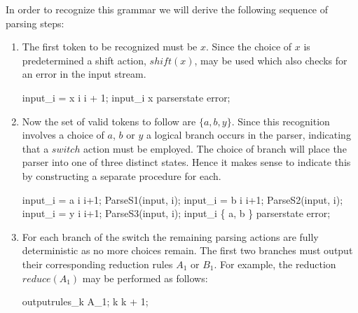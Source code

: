 \documentclass[a4paper,11pt]{article}
\begin{document}
In order to recognize this grammar we will derive the following sequence of parsing steps:
\begin{enumerate}
\item The first token to be recognized must be $x$. Since the choice of $x$ is predetermined a shift action, $shift(x)$, may be used which also checks for an error in the input stream.
\begin{center}
\begin{gcl}
\IF input_i = x \rightarrow i \becomes i + 1;
\BAR input_i \neq x \rightarrow parserstate \becomes error;
\FI
\end{gcl}
\end{center}

\item Now the set of valid tokens to follow are $\{ a, b, y \}$. 
Since this recognition involves a choice of $a$, $b$ or $y$ a logical branch occurs in the parser, indicating that a $switch$ action must be employed.
The choice of branch will place the parser into one of three distinct states. Hence it makes sense to indicate this by constructing a separate procedure for each.
\begin{center}
\begin{gcl}
\IF input_i = a \rightarrow 
                \qquad i \becomes i+1; 
                \qquad ParseS1(input, i);
\BAR input_i = b \rightarrow 
                \qquad i \becomes i+1;
                \qquad ParseS2(input, i);
\BAR input_i = y \rightarrow 
                \qquad i \becomes i+1; 
                \qquad ParseS3(input, i);
\BAR input_i \notin \{ a, b \} \rightarrow 
                \qquad parserstate \becomes error;
\FI
\end{gcl}
\end{center}

\item For each branch of the switch the remaining parsing actions are fully deterministic as no more choices remain.
The first two branches must output their corresponding reduction rules $A_1$ or $B_1$. 
For example, the reduction $reduce(A_1)$ may be performed as follows:
\begin{center}
\begin{gcl}
outputrules_k \becomes A_1;
k \becomes k + 1;
\end{gcl}
\end{center}


\end{enumerate}
\end{document}
